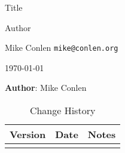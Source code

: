 \documentclass[oneside]{book}
\begin{document}
\fancyhf{} 
\renewcommand{\headrulewidth}{0pt}
\fancyfoot[C]{\thepage}

\frontmatter
\begin{titlepage}
	\vspace{1 in}
	\centering
	{\LARGE {Title}\par}
	\vspace{1 cm}
	Author\par 
	Mike Conlen \texttt{mike@conlen.org}\par
	\vspace{1 cm}
	\today
\end{titlepage}

\thispagestyle{empty}
\textbf{Author}: Mike Conlen \\

\begin{table}[ht]
	\begin{tabular}{l l l}
		\toprule
		Version & Date & Notes \\
		\hline
		&& \\
		\bottomrule
	\end{tabular}
	\caption{Change History}\label{tab:history}
\end{table}

\tableofcontents
\lstlistoflistings
\end{document}
